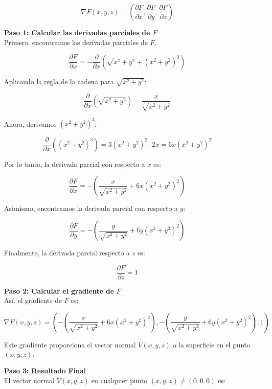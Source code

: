 \documentclass{report}
\begin{document}
    \[
    \nabla F(x, y, z) = \left( \frac{\partial F}{\partial x}, \frac{\partial F}{\partial y}, \frac{\partial F}{\partial z} \right)
    \]

    \textbf{Paso 1: Calcular las derivadas parciales de \( F \)}\\
    Primero, encontramos las derivadas parciales de \( F \).

    \[
    \frac{\partial F}{\partial x} = - \frac{\partial}{\partial x} \left( \sqrt{x^2 + y^2} + \left( x^2 + y^2 \right)^3 \right)
    \]

    Aplicando la regla de la cadena para \( \sqrt{x^2 + y^2} \):

    \[
    \frac{\partial}{\partial x} \left( \sqrt{x^2 + y^2} \right) = \frac{x}{\sqrt{x^2 + y^2}}
    \]

    Ahora, derivamos \( \left( x^2 + y^2 \right)^3 \):

    \[
    \frac{\partial}{\partial x} \left( \left( x^2 + y^2 \right)^3 \right) = 3\left( x^2 + y^2 \right)^2 \cdot 2x = 6x \left( x^2 + y^2 \right)^2
    \]

    Por lo tanto, la derivada parcial con respecto a \( x \) es:

    \[
    \frac{\partial F}{\partial x} = - \left( \frac{x}{\sqrt{x^2 + y^2}} + 6x \left( x^2 + y^2 \right)^2 \right)
    \]

    Asimismo, encontramos la derivada parcial con respecto a \( y \):

    \[
    \frac{\partial F}{\partial y} = - \left( \frac{y}{\sqrt{x^2 + y^2}} + 6y \left( x^2 + y^2 \right)^2 \right)
    \]

    Finalmente, la derivada parcial respecto a \( z \) es:

    \[
    \frac{\partial F}{\partial z} = 1
    \]

    \textbf{Paso 2: Calcular el gradiente de \( F \)}\\
    Así, el gradiente de \( F \) es:

    \[
    \nabla F(x, y, z) = \left( - \left( \frac{x}{\sqrt{x^2 + y^2}} + 6x \left( x^2 + y^2 \right)^2 \right), - \left( \frac{y}{\sqrt{x^2 + y^2}} + 6y \left( x^2 + y^2 \right)^2 \right), 1 \right)
    \]

    Este gradiente proporciona el vector normal \( V(x, y, z) \) a la superficie en el punto \( (x, y, z) \).

    \textbf{Paso 3: Resultado Final}\\
    El vector normal \( V(x, y, z) \) en cualquier punto \( (x, y, z) \neq (0,0,0) \) es:
\end{document}

